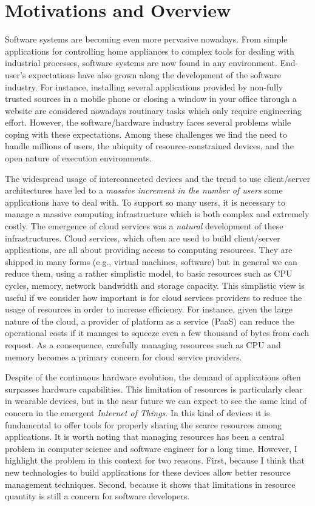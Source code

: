 \section{Motivations and Overview}

Software systems are becoming even more pervasive nowadays.
From simple applications for controlling home appliances to complex tools for dealing with industrial processes, software systems are now found in any environment.
End-user's expectations have also grown along the development of the software industry.
For instance, installing several applications provided by non-fully trusted sources in a mobile phone or closing a window in your office through a website are considered nowadays routinary  tasks which only require engineering effort.
However, the software/hardware industry faces several problems while coping with these expectations.
Among these challenges we find the need to handle millions of users, the ubiquity of resource-constrained devices, and the
open nature of execution environments.   

The widespread usage of interconnected devices and the trend to use client/server architectures have led to a \textit{massive increment in the number of users} some applications have to deal with.
To support so many users, it is necessary to manage a massive computing infrastructure which is both complex and extremely costly.
The emergence of cloud services was a \textit{natural} development of these infrastructures.
Cloud services, which often are used to  build client/server applications,  are all about providing access to computing resources.
They are shipped in many forms (e.g., virtual machines, software) but in general we can reduce them, using a rather simplistic model, to basic resources such as CPU cycles, memory, network bandwidth and storage capacity.
This simplistic view is useful if we consider how important is for cloud services providers to reduce the usage of resources in order to increase efficiency.
For instance, given the large nature of the cloud, a provider of platform as a service (PaaS) can reduce the operational costs if it manages to squeeze even a few thousand of bytes from each request.
As a consequence, carefully managing resources such as CPU and memory becomes a primary concern for cloud service providers.

Despite of the continuous hardware evolution, the demand of applications often surpasses hardware capabilities.
This limitation of resources is particularly clear in wearable devices, but in the near future we can expect to see the same kind of concern in the emergent \textit{Internet of Things}.
In this kind of devices it is fundamental to offer tools for properly sharing the scarce resources among applications.
It is worth noting that managing resources has been a central problem in computer science and software engineer for a long time.
However, I highlight the problem in this context for two reasons.
First, because I think that new technologies to build applications for these devices allow better resource management techniques.
Second, because it shows that limitations in resource quantity is still a concern for software developers.

